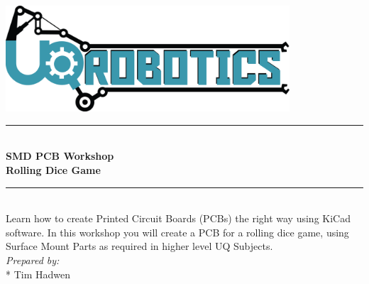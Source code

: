 \begin{titlepage}
\renewcommand{\hrule}{\rule{\linewidth}{0.5mm}}

\centering
\includegraphics[width=400px]{Robotics-Logo-Light.png}
\\[1.5cm]
\hrule
\\[0.5cm]
{\huge \bfseries SMD PCB Workshop}\\
{\large \bfseries Rolling Dice Game}
\\[0.4cm]
\hrule
\\[0.5cm]
Learn how to create Printed Circuit Boards (PCBs) the right way using KiCad software. In this workshop you will create a PCB for a rolling dice game, using Surface Mount Parts as required in higher level UQ Subjects.
\\[5cm]
\Large \emph{Prepared by:}
\\*
Tim Hadwen
\newpage
\end{titlepage}